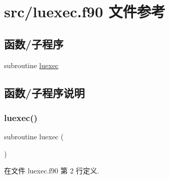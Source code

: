 \hypertarget{luexec_8f90}{}\section{src/luexec.f90 文件参考}
\label{luexec_8f90}
\subsection*{函数/子程序}
\begin{DoxyCompactItemize}
\item 
subroutine \mbox{\hyperlink{luexec_8f90_a5b4b744833efbda90c865012826ff281}{luexec}}
\end{DoxyCompactItemize}


\subsection{函数/子程序说明}
\mbox{\label{luexec_8f90_a5b4b744833efbda90c865012826ff281}} 
\subsubsection{\texorpdfstring{luexec()}{luexec()}}
{\footnotesize\ttfamily subroutine luexec (\begin{DoxyParamCaption}{ }\end{DoxyParamCaption})}



在文件 luexec.\+f90 第 2 行定义.


